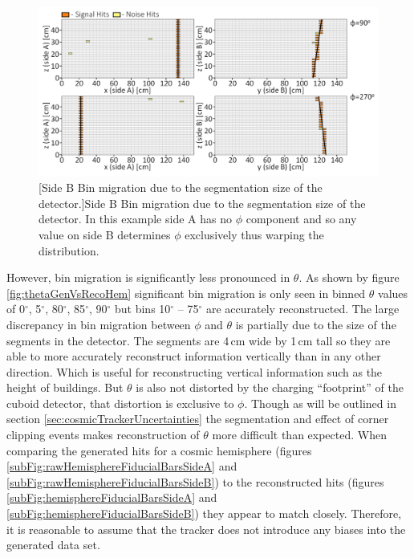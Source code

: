 \begin{figure}[!h]
 \centering
 \includegraphics[width=\linewidth]{Chapter6/Figs/Raster/phiSideBBinMigrationMedText.png}
 [Side B Bin migration due to the segmentation size of the detector.]{Side B Bin migration due to the segmentation size of the detector. In this example side A has no $\phi$ component and so any value on side B determines $\phi$ exclusively thus warping the distribution.} 
 \label{fig:cosmicBinMigrationSideB}
\end{figure}

However, bin migration is significantly less pronounced in $\theta$. As shown by figure \ref{fig:thetaGenVsRecoHem} significant bin migration is only seen in binned $\theta$ values of 0$^\circ$, 5$^\circ$, 80$^\circ$, 85$^\circ$, 90$^\circ$ but bins 10$^\circ$ -- 75$^\circ$ are accurately reconstructed. The large discrepancy in bin migration between $\phi$ and $\theta$ is partially due to the size of the segments in the detector. The segments are 4\,cm wide by 1\,cm tall so they are able to more accurately reconstruct information vertically than in any other direction. Which is useful for reconstructing vertical information such as the height of buildings. But $\theta$ is also not distorted by the charging ``footprint'' of the cuboid detector, that distortion is exclusive to $\phi$. Though as will be outlined in section \ref{sec:cosmicTrackerUncertainties} the segmentation and effect of corner clipping events makes reconstruction of $\theta$ more difficult than expected. When comparing the generated hits for a cosmic hemisphere (figures \ref{subFig:rawHemisphereFiducialBarsSideA} and \ref{subFig:rawHemisphereFiducialBarsSideB}) to the reconstructed hits (figures \ref{subFig:hemisphereFiducialBarsSideA} and \ref{subFig:hemisphereFiducialBarsSideB}) they appear to match closely. Therefore, it is reasonable to assume that the tracker does not introduce any biases into the generated data set.

